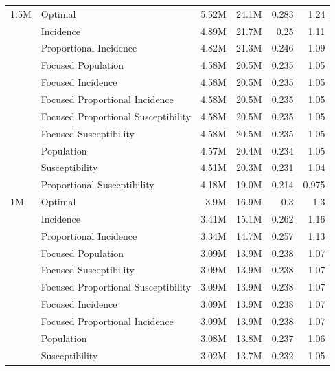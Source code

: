 \begin{fwtable}
\begin{tabular}{llrrrr}
1.5M & Optimal &   5.52M &    24.1M &          0.283 &        1.24 \\
        & Incidence &   4.89M &    21.7M &           0.25 &        1.11 \\
        & Proportional Incidence &   4.82M &    21.3M &          0.246 &        1.09 \\
        & Focused Population &   4.58M &    20.5M &          0.235 &        1.05 \\
        & Focused Incidence &   4.58M &    20.5M &          0.235 &        1.05 \\
        & Focused Proportional Incidence &   4.58M &    20.5M &          0.235 &        1.05 \\
        & Focused Proportional Susceptibility &   4.58M &    20.5M &          0.235 &        1.05 \\
        & Focused Susceptibility &   4.58M &    20.5M &          0.235 &        1.05 \\
        & Population &   4.57M &    20.4M &          0.234 &        1.05 \\
        & Susceptibility &   4.51M &    20.3M &          0.231 &        1.04 \\
        & Proportional Susceptibility &   4.18M &     19.0M &          0.214 &       0.975 \\
1M & Optimal &    3.9M &    16.9M &            0.3 &         1.3 \\
        & Incidence &   3.41M &    15.1M &          0.262 &        1.16 \\
        & Proportional Incidence &   3.34M &    14.7M &          0.257 &        1.13 \\
        & Focused Population &   3.09M &    13.9M &          0.238 &        1.07 \\
        & Focused Susceptibility &   3.09M &    13.9M &          0.238 &        1.07 \\
        & Focused Proportional Susceptibility &   3.09M &    13.9M &          0.238 &        1.07 \\
        & Focused Incidence &   3.09M &    13.9M &          0.238 &        1.07 \\
        & Focused Proportional Incidence &   3.09M &    13.9M &          0.238 &        1.07 \\
        & Population &   3.08M &    13.8M &          0.237 &        1.06 \\
        & Susceptibility &   3.02M &    13.7M &          0.232 &        1.05 \\

\end{tabular}
\end{fwtable}
